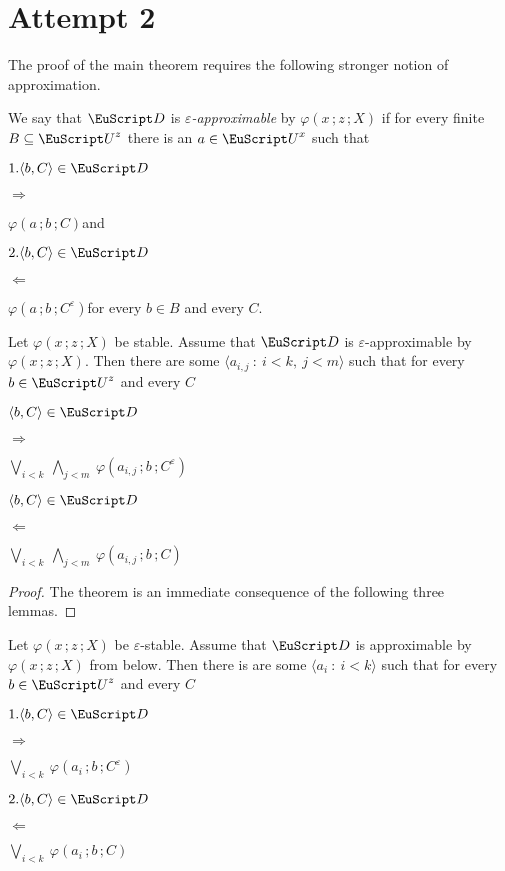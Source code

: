 \section{Attempt 2}
\def\medrel#1{\parbox{5ex}{\hfil $#1$}}
\def\ceq#1#2#3{\parbox[t]{22ex}{$\displaystyle #1$}\medrel{#2}{$\displaystyle #3$}}

The proof of the main theorem requires the following stronger notion of approximation.

\begin{definition}\label{def_e_approx_X}\strut
  We say that ${\EuScript D}$ is \emph{$\varepsilon$-approximable\/} by $\varphi(x\,;z\,;X)$ if for every finite $B\subseteq{\EuScript U}^z$ there is an $a\in{\EuScript U}^x$ such that\smallskip

  \ceq{1.\hfill \langle b,C\rangle\in{\EuScript D}}{\Rightarrow}{\varphi(a\,;b\,;C)}\quad and\smallskip

  \ceq{2.\hfill\langle b,C\rangle\in {\EuScript D}}{\Leftarrow}{\varphi(a\,;b\,;C^\varepsilon)}\hfill for every $b\in B$ and every $C$.\smallskip
\end{definition}


\begin{theorem}\label{thm_epsilon_stability_definability2}
  Let $\varphi(x\,;z\,;X)$ be stable.
  Assume that ${\EuScript D}$ is $\varepsilon$-approximable by $\varphi(x\,;z\,;X)$.
  Then there are some $\langle a_{i,j}\ :\ i< k,\ j<m\rangle$ such that for every $b\in{\EuScript U}^z$ and every $C$\medskip

  \ceq{\hfill \langle b,C\rangle\in{\EuScript D}}{\Rightarrow}{\bigvee_{i< k}\ \bigwedge_{j<m}\ \varphi(a_{i,j}\,;b\,;C^\varepsilon)}\medskip

  \ceq{\hfill \langle b,C\rangle\in{\EuScript D}}{\Leftarrow}{\bigvee_{i< k}\ \bigwedge_{j<m}\ \varphi(a_{i,j}\,;b\,;C)}
\end{theorem}

\begin{proof}
  The theorem is an immediate consequence of the following three lemmas.
\end{proof}

\begin{lemma}
  Let $\varphi(x\,;z\,;X)$ be $\varepsilon$-stable.
  Assume that ${\EuScript D}$ is approximable by $\varphi(x\,;z\,;X)$ from below.
  Then there is are some $\langle a_i\ :\ i<k\rangle$ such that for every $b\in{\EuScript U}^z$ and every $C$\medskip

  \ceq{1.\hfill \langle b,C\rangle\in{\EuScript D}}{\Rightarrow}{\bigvee_{i<k}\ \varphi(a_i\,;b\,;C^\varepsilon)}\medskip 

  \ceq{2.\hfill \langle b,C\rangle\in{\EuScript D}}{\Leftarrow}{\bigvee_{i<k}\ \varphi(a_i\,;b\,;C)} 
\end{lemma}


